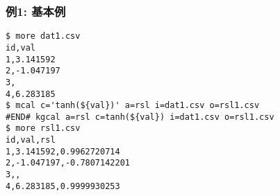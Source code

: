 \subsubsection*{例1: 基本例}



\begin{Verbatim}[baselinestretch=0.7,frame=single]
$ more dat1.csv
id,val
1,3.141592
2,-1.047197
3,
4,6.283185
$ mcal c='tanh(${val})' a=rsl i=dat1.csv o=rsl1.csv
#END# kgcal a=rsl c=tanh(${val}) i=dat1.csv o=rsl1.csv
$ more rsl1.csv
id,val,rsl
1,3.141592,0.9962720714
2,-1.047197,-0.7807142201
3,,
4,6.283185,0.9999930253
\end{Verbatim}
